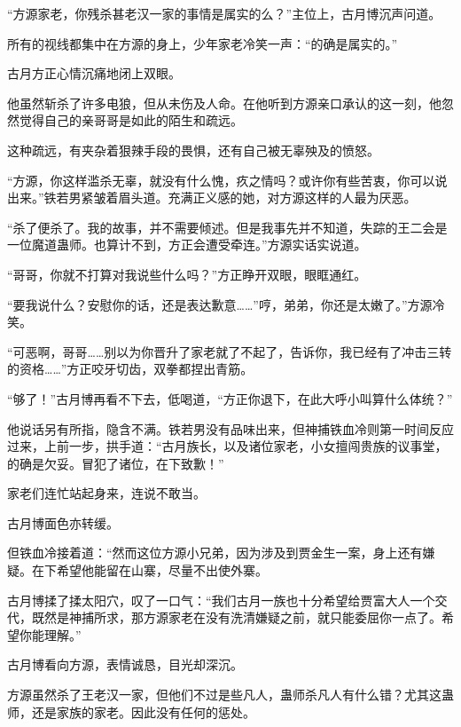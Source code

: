
\begin{this_body}



“方源家老，你残杀甚老汉一家的事情是属实的么？”主位上，古月博沉声问道。

所有的视线都集中在方源的身上，少年家老冷笑一声：“的确是属实的。”

古月方正心情沉痛地闭上双眼。

他虽然斩杀了许多电狼，但从未伤及人命。在他听到方源亲口承认的这一刻，他忽然觉得自己的亲哥哥是如此的陌生和疏远。

这种疏远，有夹杂着狠辣手段的畏惧，还有自己被无辜殃及的愤怒。

“方源，你这样滥杀无辜，就没有什么愧，疚之情吗？或许你有些苦衷，你可以说出来。”铁若男紧皱着眉头道。充满正义感的她，对方源这样的人最为厌恶。

“杀了便杀了。我的故事，并不需要倾述。但是我事先并不知道，失踪的王二会是一位魔道蛊师。也算计不到，方正会遭受牵连。”方源实话实说道。

“哥哥，你就不打算对我说些什么吗？”方正睁开双眼，眼眶通红。

“要我说什么？安慰你的话，还是表达歉意……”哼，弟弟，你还是太嫩了。”方源冷笑。

“可恶啊，哥哥……别以为你晋升了家老就了不起了，告诉你，我已经有了冲击三转的资格……”方正咬牙切齿，双拳都捏出青筋。

“够了！”古月博再看不下去，低喝道，“方正你退下，在此大呼小叫算什么体统？”

他说话另有所指，隐含不满。铁若男没有品味出来，但神捕铁血冷则第一时间反应过来，上前一步，拱手道：“古月族长，以及诸位家老，小女擅闯贵族的议事堂，的确是欠妥。冒犯了诸位，在下致歉！”

家老们连忙站起身来，连说不敢当。

古月博面色亦转缓。

但铁血冷接着道：“然而这位方源小兄弟，因为涉及到贾金生一案，身上还有嫌疑。在下希望他能留在山寨，尽量不出使外寨。

古月博揉了揉太阳穴，叹了一口气：“我们古月一族也十分希望给贾富大人一个交代，既然是神捕所求，那方源家老在没有洗清嫌疑之前，就只能委屈你一点了。希望你能理解。”

古月博看向方源，表情诚恳，目光却深沉。

方源虽然杀了王老汉一家，但他们不过是些凡人，蛊师杀凡人有什么错？尤其这蛊师，还是家族的家老。因此没有任何的惩处。


\end{this_body}
